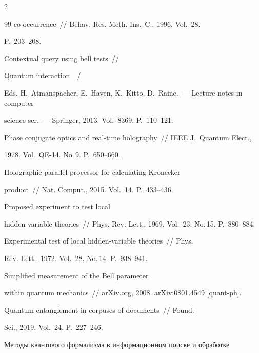 \begin{multicols}{2}
{{\begin{thebibliography}{99}
co-occurrence~// Behav. Res. Meth. Ins.~C., 1996. Vol.~28.  


P.~203--208.




 Contextual query using bell tests~//  


Quantum interaction~~/


Eds. H.~Atmanspacher, E.~Haven, K.~Kitto, D.~Raine.~--- Lecture notes in computer 


science ser.~--- Springer, 2013. Vol.~8369. P.~110--121.




 Phase conjugate optics and real-time holography~// IEEE J.~Quantum Elect., 


1978. Vol.~QE-14. No.\,9. P.~650--660.




 Holographic parallel processor for calculating Kronecker 


product~// Nat. Comput., 2015. Vol.~14. P.~433--436.




 Proposed experiment to test local 


hidden-variable theories~// Phys. Rev. Lett., 1969. Vol.~23. No.\,15. P.~880--884.




 Experimental test of local hidden-variable theories~// Phys. 


Rev. Lett., 1972. Vol.~28. No.\,14. P.~938--941.




 Simplified measurement of the Bell parameter 


within quantum mechanics~// arXiv.org, 2008. arXiv:0801.4549 [quant-ph].




 Quantum entanglement in corpuses of documents~// Found. 


Sci., 2019. Vol.~24. P.~227--246.




 Методы квантового формализма в информационном поиске и обработке 



\end{thebibliography}}}
\end{multicols}
